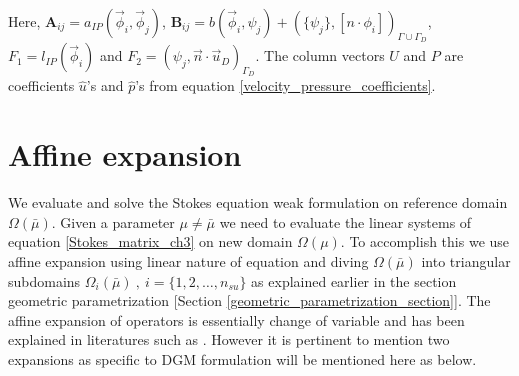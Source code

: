 \documentclass[graybox]{svmult}
\begin{document}
Here, $\bm{A}_{ij} = a_{IP} (\overrightarrow{\phi}_i,\overrightarrow{\phi}_j)$, $\bm{B}_{ij} = b(\overrightarrow{\phi}_i,\psi_j) + \left( \lbrace \psi_j \rbrace , [n \cdot \phi_i]\right)_{\Gamma \cup \Gamma_D}$, $F_1 = l_{IP}(\overrightarrow{\phi}_i)$ and $F_2 = \left( \psi_j,\overrightarrow{n} \cdot \overrightarrow{u}_D \right)_{\Gamma_D}$. The column vectors $U$ and $P$ are coefficients $\hat{u}$'s and $\hat{p}$'s from equation \eqref{velocity_pressure_coefficients}.

\section{Affine expansion}

We evaluate and solve the Stokes equation weak formulation on reference domain $\Omega({\bar{\mu}})$. Given a parameter $\mu \neq \bar{\mu}$ we need to evaluate the linear systems of equation \eqref{Stokes_matrix_ch3} on new domain $\Omega(\mu)$. To accomplish this we use affine expansion using linear nature of equation and diving $\Omega(\bar{\mu})$ into triangular subdomains $\Omega_i(\bar{\mu}) \ , \ i = \lbrace 1,2,\ldots,n_{su} \rbrace$ as explained earlier in the section geometric parametrization [Section \ref{geometric_parametrization_section}]. The affine expansion of operators is essentially change of variable and has been explained in literatures such as \cite{CRBM}. However it is pertinent to mention two expansions as specific to DGM formulation will be mentioned here as below.
\end{document}

